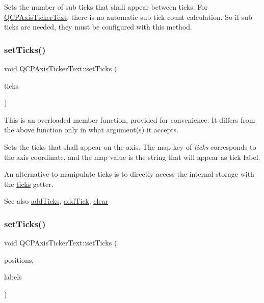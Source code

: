 Sets the number of sub ticks that shall appear between ticks. For \mbox{\hyperlink{class_q_c_p_axis_ticker_text}{Q\+C\+P\+Axis\+Ticker\+Text}}, there is no automatic sub tick count calculation. So if sub ticks are needed, they must be configured with this method. \mbox{\label{class_q_c_p_axis_ticker_text_a8cdf1f21940f1f53f5e3d30b2c74f5cf}} 
\subsubsection{\texorpdfstring{setTicks()}{setTicks()}\hspace{0.1cm}{\footnotesize\ttfamily [1/2]}}
{\footnotesize\ttfamily void Q\+C\+P\+Axis\+Ticker\+Text\+::set\+Ticks (\begin{DoxyParamCaption}\item[{const Q\+Map$<$ double, Q\+String $>$ \&}]{ticks }\end{DoxyParamCaption})}

This is an overloaded member function, provided for convenience. It differs from the above function only in what argument(s) it accepts.

Sets the ticks that shall appear on the axis. The map key of {\itshape ticks} corresponds to the axis coordinate, and the map value is the string that will appear as tick label.

An alternative to manipulate ticks is to directly access the internal storage with the \mbox{\hyperlink{class_q_c_p_axis_ticker_text_ac84622a6bb4f2a98474e185ecaf3189a}{ticks}} getter.

\begin{DoxySeeAlso}{See also}
\mbox{\hyperlink{class_q_c_p_axis_ticker_text_aba34051300eecaefbedb2df8feff2d45}{add\+Ticks}}, \mbox{\hyperlink{class_q_c_p_axis_ticker_text_aada3db69e5fc6585aaa4ea5d89552eb0}{add\+Tick}}, \mbox{\hyperlink{class_q_c_p_axis_ticker_text_a21826d2fcd9a25c194d34d4f67aa1460}{clear}} 
\end{DoxySeeAlso}
\mbox{\label{class_q_c_p_axis_ticker_text_a69f3898cc1cf11d2437851f959faa1e8}} 
\subsubsection{\texorpdfstring{setTicks()}{setTicks()}\hspace{0.1cm}{\footnotesize\ttfamily [2/2]}}
{\footnotesize\ttfamily void Q\+C\+P\+Axis\+Ticker\+Text\+::set\+Ticks (\begin{DoxyParamCaption}\item[{const Q\+Vector$<$ double $>$ \&}]{positions,  }\item[{const Q\+Vector$<$ Q\+String $>$}]{labels }\end{DoxyParamCaption})}

